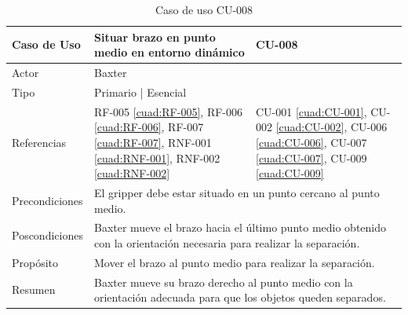 \begin{table}[H]
	\centering
	\begin{tabular}{|p{2.5cm} | p{6cm} | p{5cm} |}
		\hline
		\textbf{Caso de Uso} & Situar brazo en punto medio en entorno dinámico & \textbf{CU-008} \\
		\hline 
		Actor & \multicolumn{2}{|l|}{Baxter} \\
		\hline
		Tipo & \multicolumn{2}{|l|}{Primario | Esencial} \\
		\hline
		Referencias & RF-005 \ref{cuad:RF-005}, RF-006 \ref{cuad:RF-006}, RF-007 \ref{cuad:RF-007}, RNF-001 \ref{cuad:RNF-001}, RNF-002 \ref{cuad:RNF-002} & CU-001 \ref{cuad:CU-001}, CU-002 \ref{cuad:CU-002}, CU-006 \ref{cuad:CU-006}, CU-007 \ref{cuad:CU-007}, CU-009 \ref{cuad:CU-009} \\
		\hline
		Precondiciones & \multicolumn{2}{|l|}{\parbox{30em}{El gripper debe estar situado en un punto cercano al punto medio.}} \\
		\hline
		Poscondiciones & \multicolumn{2}{|l|}{\parbox{30em}{Baxter mueve el brazo hacia el último punto medio obtenido con la orientación necesaria para realizar la separación.}} \\
		\hline
		Propósito & \multicolumn{2}{|l|}{\parbox{30em}{Mover el brazo al punto medio para realizar la separación.}} \\
		\hline
		Resumen & \multicolumn{2}{|l|}{\parbox{30em}{Baxter mueve su brazo derecho al punto medio con la orientación adecuada para que los objetos queden separados.}} \\
		\hline
		
	\end{tabular}
\caption{Caso de uso CU-008}
\label{cuad:CU-008}
\end{table}

